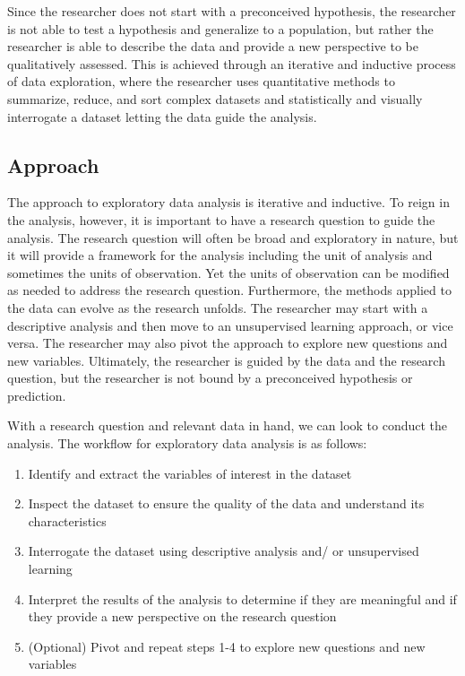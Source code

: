 \documentclass[
  letterpaper,
  DIV=11,
  numbers=noendperiod]{scrreport}
\providecommand{\tightlist}{%
  \setlength{\itemsep}{0pt}\setlength{\parskip}{0pt}}\usepackage{longtable,booktabs,array}
\theoremstyle{definition}
\theoremstyle{remark}
\begin{document}
Since the researcher does not start with a preconceived hypothesis, the
researcher is not able to test a hypothesis and generalize to a
population, but rather the researcher is able to describe the data and
provide a new perspective to be qualitatively assessed. This is achieved
through an iterative and inductive process of data exploration, where
the researcher uses quantitative methods to summarize, reduce, and sort
complex datasets and statistically and visually interrogate a dataset
letting the data guide the analysis.

\hypertarget{sec-eda-approach}{%
\subsection{Approach}\label{sec-eda-approach}}

The approach to exploratory data analysis is iterative and inductive. To
reign in the analysis, however, it is important to have a research
question to guide the analysis. The research question will often be
broad and exploratory in nature, but it will provide a framework for the
analysis including the unit of analysis and sometimes the units of
observation. Yet the units of observation can be modified as needed to
address the research question. Furthermore, the methods applied to the
data can evolve as the research unfolds. The researcher may start with a
descriptive analysis and then move to an unsupervised learning approach,
or vice versa. The researcher may also pivot the approach to explore new
questions and new variables. Ultimately, the researcher is guided by the
data and the research question, but the researcher is not bound by a
preconceived hypothesis or prediction.

With a research question and relevant data in hand, we can look to
conduct the analysis. The workflow for exploratory data analysis is as
follows:

\begin{enumerate}
\def\labelenumi{\arabic{enumi}.}
\tightlist
\item
  Identify and extract the variables of interest in the dataset
\item
  Inspect the dataset to ensure the quality of the data and understand
  its characteristics
\item
  Interrogate the dataset using descriptive analysis and/ or
  unsupervised learning
\item
  Interpret the results of the analysis to determine if they are
  meaningful and if they provide a new perspective on the research
  question
\item
  (Optional) Pivot and repeat steps 1-4 to explore new questions and new
  variables
\end{enumerate}
\end{document}
